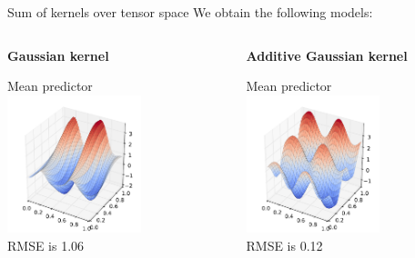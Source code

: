 \begin{frame}{Sum of kernels over tensor space}
We obtain the following models:\\ \vspace{5mm}
\begin{columns}[c]
\begin{column}{5cm}
\textbf{Gaussian kernel}
\begin{center}
Mean predictor
\includegraphics[height=4cm]{3_gaussian_process_regression/figures/python/newfromold-productvssum2-predp}\\
RMSE is 1.06
\end{center}
\end{column}
\begin{column}{5cm}
\textbf{Additive Gaussian kernel}
\begin{center}
Mean predictor
\includegraphics[height=4cm]{3_gaussian_process_regression/figures/python/newfromold-productvssum2-preda}\\
RMSE is 0.12
\end{center}
\end{column}
\end{columns}
\end{frame}

